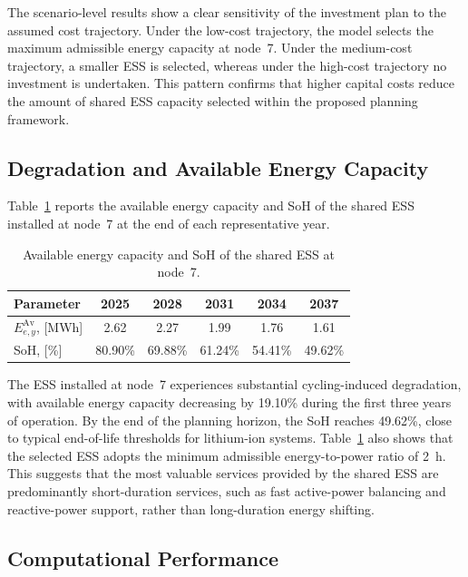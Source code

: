 \documentclass[preprint,12pt]{elsarticle}
\begin{document}
The scenario-level results show a clear sensitivity of the investment plan to the assumed cost trajectory. Under the low-cost trajectory, the model selects the maximum admissible energy capacity at node~7. Under the medium-cost trajectory, a smaller ESS is selected, whereas under the high-cost trajectory no investment is undertaken. This pattern confirms that higher capital costs reduce the amount of shared ESS capacity selected within the proposed planning framework.

\subsection{Degradation and Available Energy Capacity}

Table~\ref{tab:cs3_shared_ess_specs} reports the available energy capacity and SoH of the shared ESS installed at node~7 at the end of each representative year.

\begin{table}[htbp!]
    \centering
    \caption{Available energy capacity and SoH of the shared ESS at node~7.}
    \begin{tabular}{l ccccc}
        \toprule
        Parameter & 2025 & 2028 & 2031 & 2034 & 2037\\ 
        \midrule
        $E^{\text{Av}}_{e,y}$, [MWh]    & 2.62	    & 2.27	    & 1.99	    & 1.76	    & 1.61\\
        SoH, [\%]                       & 80.90\%   & 69.88\%   & 61.24\%   & 54.41\%   & 49.62\%\\
        \bottomrule
    \end{tabular}
    \label{tab:cs3_shared_ess_specs}
\end{table}

The ESS installed at node~7 experiences substantial cycling-induced degradation, with available energy capacity decreasing by 19.10\% during the first three years of operation. By the end of the planning horizon, the SoH reaches 49.62\%, close to typical end-of-life thresholds for lithium-ion systems. 
Table~\ref{tab:cs3_shared_ess_specs} also shows that the selected ESS adopts the minimum admissible energy-to-power ratio of 2~h. This suggests that the most valuable services provided by the shared ESS are predominantly short-duration services, such as fast active-power balancing and reactive-power support, rather than long-duration energy shifting. 

\subsection{Computational Performance}
\end{document}
